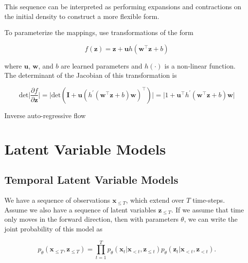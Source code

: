 \noindent This sequence can be interpreted as performing expansions and contractions on the initial density to construct a more flexible form. 

To parameterize the mappings, \cite{rezende2015variational} use transformations of the form

\begin{equation}
	f(\mathbf{z}) = \mathbf{z} + \mathbf{u}h(\mathbf{w}^\intercal \mathbf{z} + b)
	\label{eq: normalizing flows transformation}
\end{equation}

\noindent where $\mathbf{u}$, $\mathbf{w}$, and $b$ are learned parameters and $h(\cdot)$ is a non-linear function. The determinant of the Jacobian of this transformation is

\begin{equation}
	\text{det} \bigg\vert  \frac{\partial f}{\partial \mathbf{z}} \bigg\vert = \big\vert \text{det} \left( \mathbf{I} + \mathbf{u} (h^\prime (\mathbf{w}^\intercal \mathbf{z} + b) \mathbf{w})^\intercal \right) \big\vert = \big\vert 1 + \mathbf{u}^\intercal h^\prime (\mathbf{w}^\intercal \mathbf{z} + b) \mathbf{w} \big\vert
\end{equation}

Inverse auto-regressive flow \cite{kingma2016improved}



\section{Latent Variable Models}

\subsection{Temporal Latent Variable Models}

We have a sequence of observations $\mathbf{x}_{\leq T}$, which extend over $T$ time-steps. Assume we also have a sequence of latent variables $\mathbf{z}_{\leq T}$. If we assume that time only moves in the forward direction, then with parameters $\theta$, we can write the joint probability of this model as

\begin{equation}
	p_\theta (\mathbf{x}_{\leq T}, \mathbf{z}_{\leq T}) = \prod_{t=1}^T p_\theta (\mathbf{x}_{t} | \mathbf{x}_{< t}, \mathbf{z}_{\leq t}) p_\theta (\mathbf{z}_{t} | \mathbf{x}_{< t}, \mathbf{z}_{< t}).
\end{equation}

